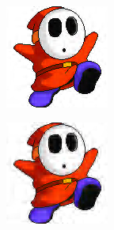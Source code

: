 \begin{figure}
  \centering
  \begin{subfigure}[b]{0.24\textwidth}
    \centering
    \includegraphics[width=\textwidth]{plaatjes/shyguy_db2_0_1.png}
  \end{subfigure}
  \begin{subfigure}[b]{0.24\textwidth}
    \centering
    \includegraphics[width=\textwidth]{plaatjes/shyguy_db2_0_05.png}

\end{subfigure}
\end{figure}
